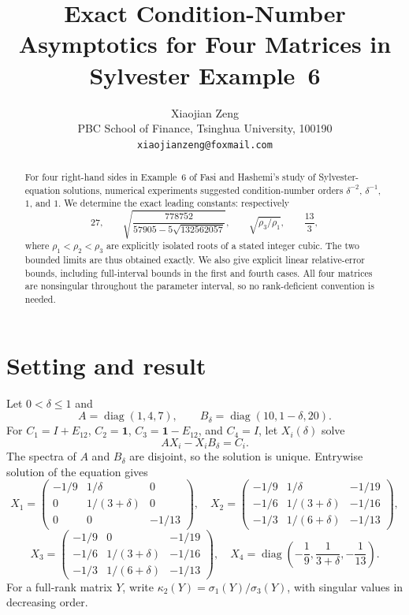 \documentclass[11pt]{article}
\title{Exact Condition-Number Asymptotics for Four Matrices in Sylvester Example~6}
\author{Xiaojian Zeng\\
PBC School of Finance, Tsinghua University, 100190\\
\texttt{xiaojianzeng@foxmail.com}}
\date{}
\begin{document}
\maketitle

\begin{abstract}
For four right-hand sides in Example~6 of Fasi and Hashemi's study of
Sylvester-equation solutions, numerical experiments suggested condition-number
orders $\delta^{-2}$, $\delta^{-1}$, $1$, and $1$.  We determine the exact
leading constants: respectively
\[
27,\qquad
\sqrt{\frac{778752}{57905-5\sqrt{132562057}}},\qquad
\sqrt{\rho_3/\rho_1},\qquad \frac{13}{3},
\]
where $\rho_1<\rho_2<\rho_3$ are explicitly isolated roots of a stated
integer cubic.  The two bounded limits are thus obtained exactly.  We also
give explicit linear relative-error bounds, including full-interval bounds in
the first and fourth cases.  All four matrices are nonsingular throughout the
parameter interval, so no rank-deficient convention is needed.
\end{abstract}

\section{Setting and result}

Let $0<\delta\leq 1$ and
\[
A=\operatorname{diag}(1,4,7),\qquad
B_\delta=\operatorname{diag}(10,1-\delta,20).
\]
For $C_1=I+E_{12}$, $C_2=\mathbf 1$, $C_3=\mathbf 1-E_{12}$, and
$C_4=I$, let $X_i(\delta)$ solve
\[
 AX_i-X_iB_\delta=C_i.
\]
The spectra of $A$ and $B_\delta$ are disjoint, so the solution is unique.
Entrywise solution of the equation gives
\[
X_1=\begin{pmatrix}
-1/9&1/\delta&0\\0&1/(3+\delta)&0\\0&0&-1/13
\end{pmatrix},
\quad
X_2=\begin{pmatrix}
-1/9&1/\delta&-1/19\\
-1/6&1/(3+\delta)&-1/16\\
-1/3&1/(6+\delta)&-1/13
\end{pmatrix},
\]
\[
X_3=\begin{pmatrix}
-1/9&0&-1/19\\
-1/6&1/(3+\delta)&-1/16\\
-1/3&1/(6+\delta)&-1/13
\end{pmatrix},
\quad
X_4=\operatorname{diag}\!\left(-\frac19,\frac1{3+\delta},-\frac1{13}\right).
\tag{1}
\]
For a full-rank matrix $Y$, write
$\kappa_2(Y)=\sigma_1(Y)/\sigma_3(Y)$, with singular values in decreasing
order.
\end{document}
